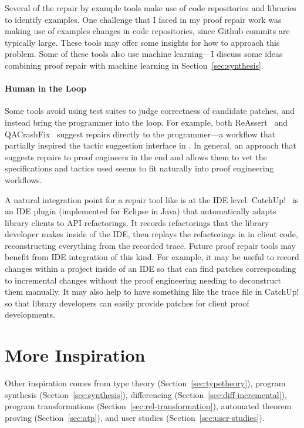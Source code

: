 Several of the repair by example tools make use of code repositories and libraries to identify examples.
One challenge that I faced in my proof repair work was making use of examples changes in code repositories, since Github commits are typically large.
These tools may offer some insights for how to approach this problem.
Some of these tools also use machine learning---I discuss some ideas combining proof repair
with machine learning in Section~\ref{sec:synthesis}.

\paragraph{Human in the Loop}
Some tools avoid using test suites to judge correctness of candidate patches, and instead
bring the programmer into the loop. For example, both ReAssert~\cite{daniel2009reassert}
and QACrashFix~\cite{gao2015fixing} suggest repairs directly to the programmer---a workflow
that partially inspired the tactic suggestion interface in \toolnamec.
In general, an approach that suggests repairs to proof engineers in the end
and allows them to vet the specifications and tactics used seems to fit naturally into proof engineering workflows. 

A natural integration point for a repair tool like \sysnamelong is at the IDE level. 
CatchUp!~\cite{Henkel:2005:CCR:1062455.1062512} is an IDE plugin (implemented for Eclipse in Java) that automatically adapts library clients to API refactorings.
It records refactorings that the library developer makes inside of the IDE,
then replays the refactorings in in client code, reconstructing everything from the recorded trace.
Future proof repair tools may benefit from IDE integration of this kind.
For example, it may be useful to record changes within a project inside of an IDE 
so that \sysnamelong can find patches corresponding to incremental changes without the proof engineering needing to deconstruct them manually.
It may also help to have something like the trace file in CatchUp! so that library developers can easily provide patches for client proof developments.

\section{More Inspiration}
\label{sec:inspiration}

Other inspiration comes from type theory (Section~\ref{sec:typetheory}),
program synthesis (Section~\ref{sec:synthesis}),
differencing (Section~\ref{sec:diff-incremental}),
program transformations (Section~\ref{sec:rel-transformation}),
automated theorem proving (Section~\ref{sec:atp}),
and user studies (Section~\ref{sec:user-studies}).

